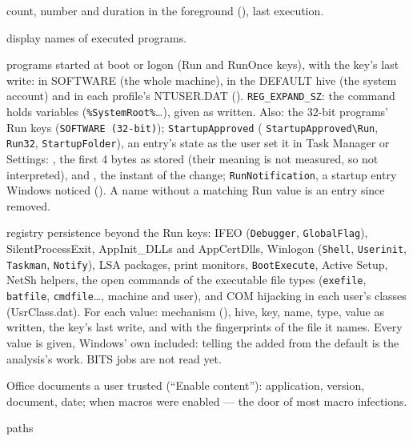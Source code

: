 \documentclass[11pt,a4paper,oneside]{report}
\begin{document}
\begin{description}[style=nextline,leftmargin=1.2em]
        count, number and duration in the foreground (), last
        execution.
  \item[\fichier{muicache.json}] display names of executed programs.
  \item[\fichier{run.json}] programs started at boot or logon (Run and RunOnce
        keys), with the key's last write: in SOFTWARE (the whole machine), in
        the DEFAULT hive (the system account) and in each profile's NTUSER.DAT
        ().  \texttt{REG\_EXPAND\_SZ}: the command
        holds variables (\texttt{\%SystemRoot\%}\ldots), given as written.
        Also: the 32-bit programs' Run keys (\texttt{SOFTWARE (32-bit)});
        \texttt{StartupApproved} (
        \texttt{StartupApproved\textbackslash Run}, \texttt{Run32},
        \texttt{StartupFolder}), an entry's state as the user set it in Task
        Manager or Settings: , the first 4 bytes as stored (their
        meaning is not measured, so not interpreted), and , the
        instant of the change; \texttt{RunNotification}, a startup entry Windows
        noticed (). A name without a matching Run value is
        an entry since removed.
  \item[\fichier{persistence.json}] registry persistence beyond the Run keys:
        IFEO (\texttt{Debugger}, \texttt{GlobalFlag}), SilentProcessExit,
        AppInit\_DLLs and AppCertDlls, Winlogon (\texttt{Shell},
        \texttt{Userinit}, \texttt{Taskman}, \texttt{Notify}), LSA packages,
        print monitors, \texttt{BootExecute}, Active Setup, NetSh helpers, the
        open commands of the executable file types (\texttt{exefile},
        \texttt{batfile}, \texttt{cmdfile}\ldots, machine and user), and COM
        hijacking in each user's classes (UsrClass.dat). For each value:
        mechanism (), hive, key, name, type, value as written,
        the key's last write, and with  the fingerprints of the
        file it names. Every value is given, Windows' own included: telling the
        added from the default is the analysis's work. BITS jobs are not read
        yet.
  \item[\fichier{office\_trust\_records.json}] Office documents a user trusted
        (``Enable content''): application, version, document, date;
         when macros were enabled — the door of most macro
        infections.
  \item[\fichier{typed\_paths.json}, \fichier{word\_wheel\_query.json}] paths

\end{description}
\end{document}
